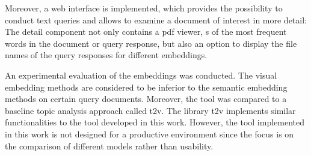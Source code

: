 Moreover, a web interface is implemented, which provides the possibility to conduct text queries and
allows to examine a document of interest in more detail:
The detail component not only contains a \ac{pdf} viewer, 
\wordcloud{}s of the most frequent words in the document or query response, but also an option to display the file names of the query responses for different embeddings.

An experimental evaluation of the embeddings was conducted.
The visual embedding methods are considered to be inferior to the semantic embedding methods on certain query documents.
Moreover, the tool was compared to a baseline topic analysis approach called \ac{t2v}.
The library \ac{t2v} implements similar functionalities to the tool developed in this work.
However, the tool implemented in this work is not designed for a productive environment since 
the focus is on the comparison of different models rather than usability.